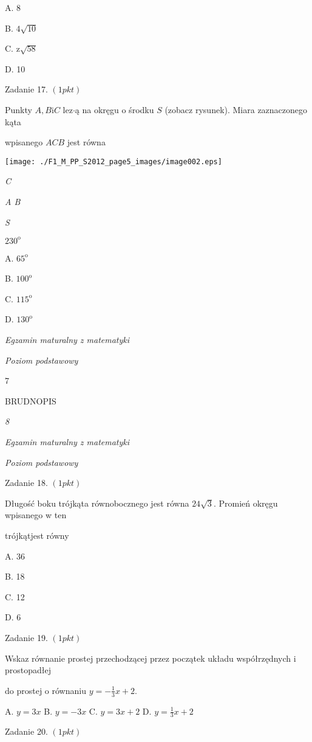 \documentclass[a4paper,12pt]{article}
\begin{document}
A. 8

B. $4\sqrt{10}$

C. $\mathrm{z}\sqrt{58}$

D. 10

Zadanie 17. $(1pkt)$

Punkty $A, B \mathrm{i} C$ lez$\cdot$ą na okręgu o środku $S$ (zobacz rysunek). Miara zaznaczonego kąta

wpisanego $ACB$ jest równa
\begin{center}
\texttt{[image: ./F1\_M\_PP\_S2012\_page5\_images/image002.eps]}
\end{center}
{\it C}

{\it A  B}

{\it S}

$230^{\mathrm{o}}$

A. $65^{\mathrm{o}}$

B. $100^{\mathrm{o}}$

C. $115^{\mathrm{o}}$

D. $130^{\mathrm{o}}$





{\it Egzamin maturalny z matematyki}

{\it Poziom podstawowy}

7

BRUDNOPIS





{\it 8}

{\it Egzamin maturalny z matematyki}

{\it Poziom podstawowy}

Zadanie 18. $(1pkt)$

Długość boku trójkąta równobocznego jest równa $24\sqrt{3}$. Promień okręgu wpisanego w ten

trójkątjest równy

A. 36

B. 18

C. 12

D. 6

Zadanie 19. $(1pkt)$

Wskaz równanie prostej przechodzącej przez początek układu współrzędnych i prostopadłej

do prostej o równaniu $y=-\displaystyle \frac{1}{3}x+2.$

A. $y=3x$ B. $y=-3x$ C. $y=3x+2$ D. $y=\displaystyle \frac{1}{3}x+2$

Zadanie 20. $(1pkt)$
\end{document}
